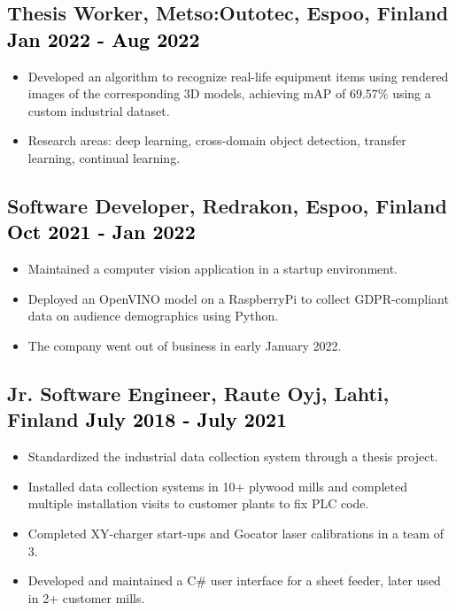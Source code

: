 \documentclass[a4paper,10pt]{article}
\begin{document}
\subsection*{Thesis Worker, Metso:Outotec, Espoo, Finland \hfill \textcolor{black}{Jan 2022 - Aug 2022}}
\begin{itemize}
    \item Developed an algorithm to recognize real-life equipment items using rendered images of the corresponding 3D models, achieving mAP of 69.57\% using a custom industrial dataset.
    \item Research areas: deep learning, cross-domain object detection, transfer learning, continual learning.
\end{itemize}

\subsection*{Software Developer, Redrakon, Espoo, Finland \hfill \textcolor{black}{Oct 2021 - Jan 2022}}
\begin{itemize}
    \item Maintained a computer vision application in a startup environment.
    \item Deployed an OpenVINO model on a RaspberryPi to collect GDPR-compliant data on audience demographics using Python.
    \item The company went out of business in early January 2022.
\end{itemize}

\subsection*{Jr. Software Engineer, Raute Oyj, Lahti, Finland \hfill \textcolor{black}{July 2018 - July 2021}}
\begin{itemize}
    \item Standardized the industrial data collection system through a thesis project.
    \item Installed data collection systems in 10+ plywood mills and completed multiple installation visits to customer plants to fix PLC code.
    \item Completed XY-charger start-ups and Gocator laser calibrations in a team of 3.
    \item Developed and maintained a C\# user interface for a sheet feeder, later used in 2+ customer mills.
\end{itemize}
\end{document}
